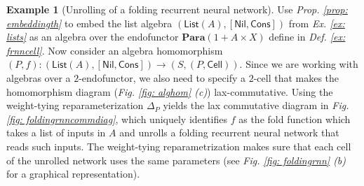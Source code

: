 \documentclass[11pt,a4paper,openright,twoside]{report}
\newcounter{mycounter}
\theoremstyle{plain}
\theoremstyle{definition}
\newtheorem{example}[mycounter]{Example}
\begin{document}
\begin{example}[Unrolling of a folding recurrent neural network]
  \label{ex: frnnunroll}
  Use \textit{Prop. \ref{prop: embeddingth}} to embed the list algebra $(\mathsf{List}(A), [\mathsf{Nil}, \mathsf{Cons}])$ from \textit{Ex. \ref{ex: lists}} as an algebra over the endofunctor $\mathbf{Para}(1 + A \times X)$ define in \textit{Def. \ref{ex: frnncell}}. Now consider an algebra homomorphism $(P,f): (\mathsf{List}(A), [\mathsf{Nil}, \mathsf{Cons}]) \to (S,(P,\mathsf{Cell}))$. Since we are working with algebras over a $2$-endofunctor, we also need to specify a $2$-cell that makes the homomorphism diagram (\textit{Fig. \ref{fig: alghom} (c)}) lax-commutative. Using the weight-tying reparameterization $\Delta_P$ yields the lax commutative diagram in \textit{Fig. \ref{fig: foldingrnncommdiag}}, which uniquely identifies $f$ as the fold function which takes a list of inputs in $A$ and unrolls a folding recurrent neural network that reads such inputs. The weight-tying reparametrization makes sure that each cell of the unrolled network uses the same parameters (see \textit{Fig. \ref{fig: foldingrnn} (b)} for a graphical representation). 
\end{example}
\end{document}
